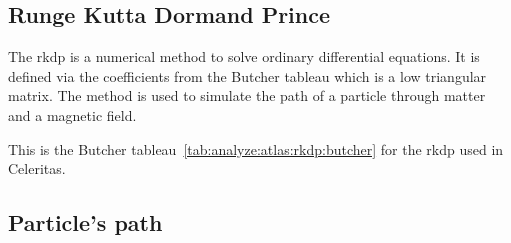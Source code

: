 \subsection{Runge Kutta Dormand Prince}
\label{ch:analyze:atlas:rkdp}

The \acrfull{rkdp} is a numerical method to solve ordinary differential equations.
It is defined via the coefficients from the Butcher tableau which is a low triangular
matrix.
The method is used to simulate the path of a particle through matter and a
magnetic field.

This is the Butcher tableau~\ref{tab:analyze:atlas:rkdp:butcher} for the \acrshort{rkdp} used in Celeritas.

\begin{table}[ht]
    \label{tab:analyze:atlas:rkdp:butcher}
\end{table}



\subsection{Particle's path}
\label{ch:analyze:atlas:path}

